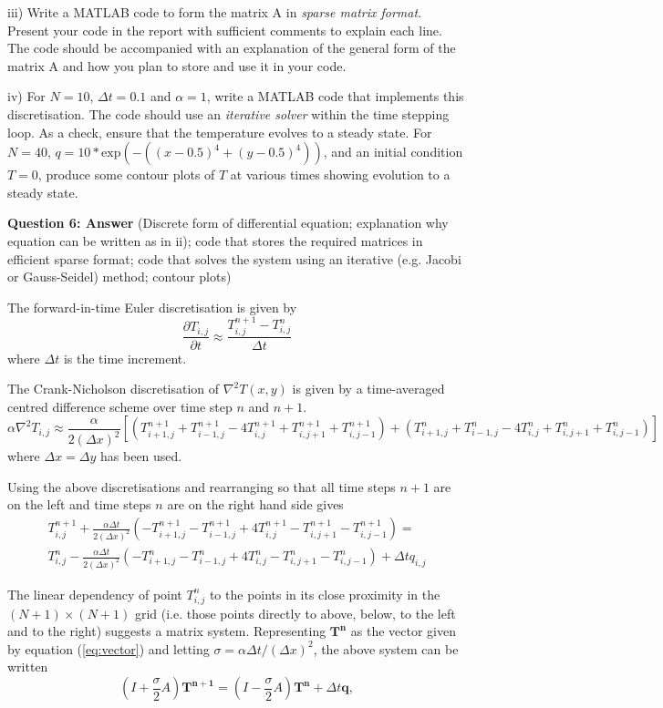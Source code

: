 \documentclass[12pt]{article}
\def\MM#1{\boldsymbol{#1}}
\begin{document}
iii) Write a MATLAB code to form the matrix A in \emph{sparse matrix format}. Present your code in the report with sufficient comments to explain each line. The code should be accompanied with an explanation of the general form of the matrix A and how you plan to store and use it in your code.

iv) For $N = 10$, $\Delta t = 0.1$ and $\alpha = 1$, write a MATLAB code that implements this discretisation. The code should use an \emph{iterative solver} within the time stepping loop. As a check, ensure that the temperature evolves to a steady state. \newline For $N = 40$, $q = 10*\mathrm{exp}(-((x-0.5)^4+(y-0.5)^4))$, and an initial condition $T=0$, produce some contour plots of $T$ at various times showing evolution to a steady state. 

\textbf{Question 6: Answer} (Discrete form of differential equation; explanation why equation can be written as in ii); code that stores the required matrices in efficient sparse format; code that solves the system using an iterative (e.g. Jacobi or Gauss-Seidel) method; contour plots)

The forward-in-time Euler discretisation is given by 
$$\frac{\partial T_{i,j}}{\partial t} \approx \frac{T^{n+1}_{i,j}-T^{n}_{i,j}}{\Delta t}$$
where $\Delta t$ is the time increment.

The Crank-Nicholson discretisation of $\nabla^2T(x,y)$ is given by a time-averaged centred difference scheme over time step $n$ and $n+1$.
$$\alpha \nabla^2T_{i,j} \approx \frac{\alpha}{2 (\Delta x)^2}[(T^{n+1}_{i+1,j} + T^{n+1}_{i-1,j} -4 T^{n+1}_{i,j} + T^{n+1}_{i,j+1} + T^{n+1}_{i,j-1}) + (T^{n}_{i+1,j} + T^{n}_{i-1,j} -4 T^{n}_{i,j} + T^{n}_{i,j+1} + T^{n}_{i,j-1})]$$
where $\Delta x = \Delta y$ has been used.

Using the above discretisations and rearranging so that all time steps $n+1$ are on the left and time steps $n$ are on the right hand side gives
\begin{multline*}
	T^{n+1}_{i,j} + \frac{\alpha \Delta t}{2 (\Delta x)^2}(-T^{n+1}_{i+1,j} - T^{n+1}_{i-1,j} +4 T^{n+1}_{i,j} - T^{n+1}_{i,j+1} -T^{n+1}_{i,j-1}) = \\ T^{n}_{i,j} - \frac{\alpha \Delta t}{2 (\Delta x)^2} (-T^{n}_{i+1,j} - T^{n}_{i-1,j} +4 T^{n}_{i,j} -	T^{n}_{i,j+1} - T^{n}_{i,j-1}) + \Delta t q_{i,j}
\end{multline*}

The linear dependency of point $T^{n}_{i,j}$ to the points in its close proximity in the $(N+1) \times (N+1)$ grid (i.e. those points directly to above, below, to the left and to the right) suggests a matrix system. Representing $\MM{T^n}$ as the vector given by equation (\ref{eq:vector}) and letting $\sigma=\alpha \Delta t/(\Delta x)^2$, the above system can be written 
\begin{equation*}
\left(I+\frac{\sigma}{2}A \right)\MM{T^{n+1}} = \left(I-\frac{\sigma}{2}A \right)\MM{T^{n}}+\Delta t \MM{q},
\end{equation*}
\end{document}
